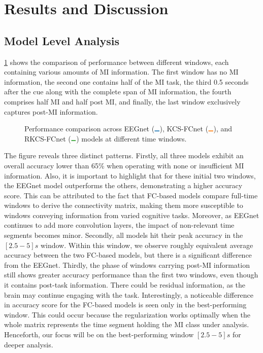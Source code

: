 \section{Results and Discussion}

\subsection{Model Level Analysis}

\cref{fig:acc_windows} shows the comparison of performance between different windows, each containing various amounts of MI information. The first window has no MI information, the second one contains half of the MI task, the third 0.5 seconds after the cue along with the complete span of MI information, the fourth comprises half MI and half post MI, and finally, the last window exclusively captures post-MI information.



\begin{figure}[h!]
  \centering
  \resizebox{\linewidth}{!}{}
  \caption{Performance comparison across EEGnet (${\lineplot{steelblue31119180}}$), KCS-FCnet (${\lineplot{darkorange25512714}}$), and RKCS-FCnet (${\lineplot{forestgreen4416044}}$) models at different time windows.}\label{fig:acc_windows}
\end{figure}

The figure reveals three distinct patterns. Firstly, all three models exhibit an overall accuracy lower than 65\% when operating with none or insufficient MI information. Also, it is important to highlight that for these initial two windows, the EEGnet model outperforms the others, demonstrating a higher accuracy score. This can be attributed to the fact that FC-based models compare full-time windows to derive the connectivity matrix, making them more susceptible to windows conveying information from varied cognitive tasks. Moreover, as EEGnet continues to add more convolution layers, the impact of non-relevant time segments becomes minor. Secondly, all models hit their peak accuracy in the $[2.5-5]s$ window. Within this window, we observe roughly equivalent average accuracy between the two FC-based models, but there is a significant difference from the EEGnet. Thirdly, the phase of windows carrying post-MI information still shows greater accuracy performance than the first two windows, even though it contains post-task information. There could be residual information, as the brain may continue engaging with the task. Interestingly, a noticeable difference in accuracy score for the FC-based models is seen only in the best-performing window. This could occur because the regularization works optimally when the whole matrix represents the time segment holding the MI class under analysis. Henceforth, our focus will be on the best-performing window $[2.5-5]s$ for deeper analysis.

